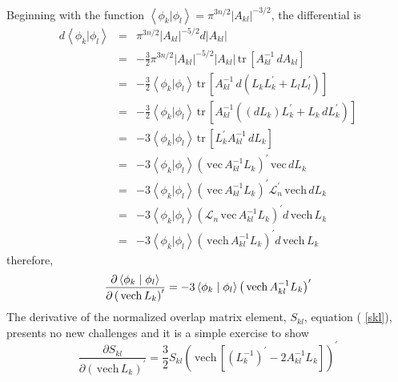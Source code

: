 \documentclass[12pt,thmsa,suthesis,verbatim]{report}
\begin{document}
Beginning with the function $\left\langle \phi _k\right. |\left. \phi
_l\right\rangle =\pi ^{3n/2}\left| A_{kl}\right| ^{-3/2}$, the differential
is 
\begin{eqnarray}
d\left\langle \phi _k\right. |\left. \phi _l\right\rangle &=&\pi
^{3n/2}\left| A_{kl}\right| ^{-5/2}d\left| A_{kl}\right|  \nonumber \\
\ &=&-\frac 32\pi ^{3n/2}\left| A_{kl}\right| ^{-5/2}\left| A_{kl}\right| \,%
\mathrm{tr}\,\left[ A_{kl}^{-1}\,dA_{kl}\right]  \nonumber \\
\ &=&-\frac 32\left\langle \phi _k\right. |\left. \phi _l\right\rangle \,%
\mathrm{tr}\,\left[ A_{kl}^{-1}\,d\left( L_kL_k^{\prime }+L_lL_l^{\prime
}\right) \right]  \nonumber \\
\ &=&-\frac 32\left\langle \phi _k\right. |\left. \phi _l\right\rangle \,%
\mathrm{tr}\,\left[ A_{kl}^{-1}\left( \left( dL_k\right) L_k^{\prime
}+L_k\,dL_k^{\prime }\right) \right]  \nonumber \\
\ &=&-3\left\langle \phi _k\right. |\left. \phi _l\right\rangle \,\mathrm{tr}%
\,\left[ L_k^{\prime }A_{kl}^{-1}\,dL_k\right]  \nonumber \\
\ &=&-3\left\langle \phi _k\right. |\left. \phi _l\right\rangle \left( \,%
\mathrm{vec}\,A_{kl}^{-1}L_k\right) ^{\prime }\,\mathrm{vec}\,dL_k  \nonumber
\\
\ &=&-3\left\langle \phi _k\right. |\left. \phi _l\right\rangle \left( \,%
\mathrm{vec}\,A_{kl}^{-1}L_k\right) ^{\prime }\mathcal{L}_n^{\prime }\,%
\mathrm{vech}\,dL_k  \nonumber \\
\ &=&-3\left\langle \phi _k\right. |\left. \phi _l\right\rangle \left( 
\mathcal{L}_n\,\mathrm{vec}\,A_{kl}^{-1}L_k\right) ^{\prime }d\,\mathrm{vech}%
\,L_k  \nonumber \\
\ &=&-3\left\langle \phi _k\right. |\left. \phi _l\right\rangle \left( \,%
\mathrm{vech}\,A_{kl}^{-1}L_k\right) ^{\prime }d\,\mathrm{vech}\,L_k
\end{eqnarray}
therefore, 
\begin{equation}
\frac{\partial \left\langle \phi _k\right. |\left. \phi _l\right\rangle }{%
\partial \left( \,\mathrm{vech}\,L_k\right) ^{\prime }}=-3\left\langle \phi
_k\right. |\left. \phi _l\right\rangle \left( \,\mathrm{vech}%
\,A_{kl}^{-1}L_k\right) ^{\prime }
\end{equation}
The derivative of the normalized overlap matrix element, $S_{kl}$, equation (%
\ref{skl}), presents no new challenges and it is a simple exercise to show 
\begin{equation}
\frac{\partial S_{kl}}{\partial \left( \,\mathrm{vech}\,L_k\right) ^{\prime }%
}=\frac 32S_{kl}\left( \,\mathrm{vech}\,\left[ \left( L_k^{-1}\right)
^{\prime }-2A_{kl}^{-1}L_k\right] \right) ^{\prime }
\end{equation}
\end{document}
